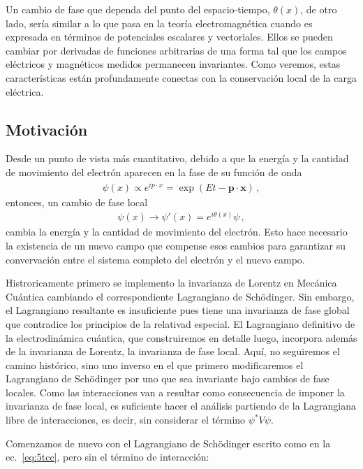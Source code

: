 Un cambio de fase que dependa del punto del espacio-tiempo, $\theta(x)$, de otro lado, sería similar a lo que pasa en la teoría electromagnética cuando es expresada en términos de potenciales escalares y vectoriales. Ellos se pueden cambiar por derivadas de funciones arbitrarias de una forma tal que los campos eléctricos y magnéticos medidos permanecen invariantes. Como veremos, estas características están profundamente conectas con la conservación local de la carga eléctrica.  

\subsection{Motivación}

Desde un punto de vista más cuantitativo, debido a que la energía y la cantidad de movimiento del electrón aparecen  en la fase de su función de onda
\begin{align}
  \psi(x)\propto e^{i p\cdot x}=\exp(Et-\mathbf{p}\cdot \mathbf{x})\,,
\end{align}
entonces, un cambio de fase local
\begin{align}
 \psi(x)\to \psi'(x)=e^{{i\theta(x)}}\psi\,,
\end{align}
cambia la energía y la cantidad de movimiento del electrón. Esto hace necesario la existencia de un nuevo campo que compense esos cambios para garantizar su convervación entre el sistema completo del electrón y el nuevo campo.

Histroricamente primero se implemento la invarianza de Lorentz en Mecánica Cuántica cambiando el correspondiente Lagrangiano de Sch\"odinger. Sin embargo, el Lagrangiano resultante es insuficiente pues tiene una invarianza de fase global que contradice los principios de la relativad especial. El Lagrangiano definitivo de la electrodinámica cuántica, que construiremos en detalle luego, incorpora además de la invarianza de Lorentz, la invarianza de fase local. Aquí, no seguiremos el camino histórico, sino uno inverso en el  que primero modificaremos el Lagrangiano de Sch\"odinger por uno que sea invariante bajo cambios de fase locales. Como las interacciones van a resultar como consecuencia de imponer la invarianza de fase local, es suficiente hacer el análisis partiendo de la Lagrangiana libre de interacciones, es decir, sin considerar el término $\psi^{*}V\psi$.

Comenzamos de nuevo con el Lagrangiano de Schödinger escrito como en la ec.~\eqref{eq:5tcc}, pero sin el término de interacción:

